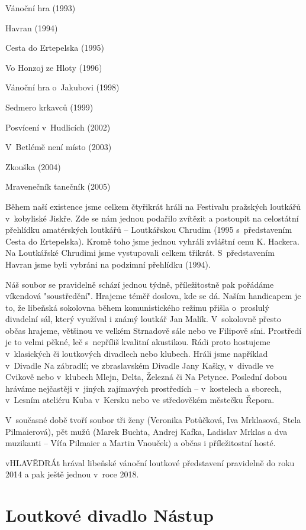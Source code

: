 \documentclass[a5paper, 12pt, twoside]{article}
\begin{document}
Vánoční hra (1993)

Havran (1994)

Cesta do Ertepelska (1995)

Vo Honzoj ze Hloty (1996)

Vánoční hra o~Jakubovi (1998)

Sedmero krkavců (1999)

Posvícení v~Hudlicích (2002)

V~Betlémě není místo (2003)

Zkouška (2004)

Mravenečník tanečník (2005)

Během naší existence jsme celkem čtyřikrát hráli na Festivalu pražských
loutkářů v~kobyliské Jiskře. Zde se nám jednou podařilo zvítězit a
postoupit na celostátní přehlídku amatérských loutkářů -- Loutkářskou
Chrudim (1995 s~představením Cesta do Ertepelska). Kromě toho jsme
jednou vyhráli zvláštní cenu K. Hackera. Na Loutkářské Chrudimi jsme
vystupovali celkem třikrát. S~představením Havran jsme byli vybráni na
podzimní přehlídku (1994).

Náš soubor se pravidelně schází jednou týdně, příležitostně pak pořádáme
víkendová "soustředění". Hrajeme téměř doslova, kde se dá. Naším
handicapem je to, že libeňská sokolovna během komunistického režimu
přišla o~proslulý divadelní sál, který využíval i známý loutkář Jan
Malík. V~sokolovně přesto občas hrajeme, většinou ve velkém Strnadově
sále nebo ve Filipově síni. Prostředí je to velmi pěkné, leč s~nepříliš
kvalitní akustikou. Rádi proto hostujeme v~klasických či loutkových
divadlech nebo klubech. Hráli jsme například v~Divadle Na zábradlí; ve
zbraslavském Divadle Jany Kašky, v~divadle ve Cvikově nebo v~klubech
Mlejn, Delta, Železná či Na Petynce. Poslední dobou hráváme nejčastěji
v~jiných zajímavých prostředích -- v~kostelech a sborech, v~Lesním
ateliéru Kuba v~Kersku nebo ve středověkém městečku Řepora.

V~současné době tvoří soubor tři ženy (Veronika Potůčková, Iva
Mrklasová, Stela Pilmaierová), pět mužů (Marek Buchta, Andrej Kafka,
Ladislav Mrklas a dva muzikanti -- Víťa Pilmaier a Martin Vnouček) a
občas i příležitostní hosté.

vHLAVĚDRÁt hrával libeňské vánoční loutkové představení pravidelně do
roku 2014 a pak ještě jednou v~roce 2018.

\section{Loutkové divadlo Nástup}
\end{document}
